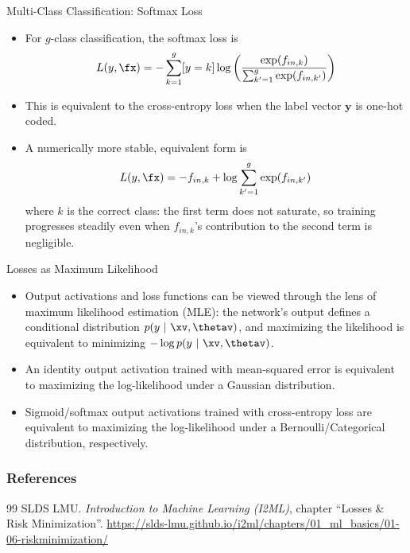 \begin{vbframe}{Multi-Class Classification: Softmax Loss}
\begin{itemize}
\item For $g$-class classification, the softmax loss is
$$L(y, \fx) = - \sum_{k = 1}^g [y = k] \log \left( \frac{\exp(f_{in,k})}{\sum_{k'=1}^g\exp(f_{in,k'})}\right)$$
\item This is equivalent to the cross-entropy loss when the label vector
$\bm{y}$ is one-hot coded.
\item A numerically more stable, equivalent form is
$$ L(y, \fx) = - f_{in,k} + \log {\sum_{k'=1}^g\exp(f_{in,k'})}$$
where $k$ is the correct class: the first term does not saturate, so training
progresses steadily even when $f_{in,k}$'s contribution to the second term is
negligible.
\end{itemize}
\end{vbframe}

\begin{vbframe}{Losses as Maximum Likelihood}
\begin{itemize}
\item Output activations and loss functions can be viewed through the lens of
maximum likelihood estimation (MLE): the network's output defines a
conditional distribution $p(y~|~\xv,\thetav)$, and maximizing the likelihood
is equivalent to minimizing $-\log p(y~|~\xv,\thetav)$.
\item An identity output activation trained with mean-squared error is
equivalent to maximizing the log-likelihood under a Gaussian distribution.
\item Sigmoid/softmax output activations trained with cross-entropy loss are
equivalent to maximizing the log-likelihood under a Bernoulli/Categorical
distribution, respectively.
\end{itemize}
\end{vbframe}

\begin{vbframe}
\frametitle{References}
\footnotesize{
\begin{thebibliography}{99}
 SLDS LMU. \textit{Introduction to Machine Learning
(I2ML)}, chapter \enquote{Losses \& Risk Minimization}.
\url{https://slds-lmu.github.io/i2ml/chapters/01_ml_basics/01-06-riskminimization/}
\end{thebibliography}
}
\end{vbframe}

